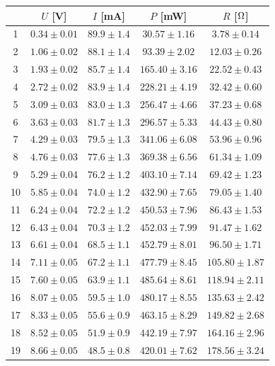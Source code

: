 \begin{table}[!h]
\begin{center}
\begin{tabular}{|c|c|c|c|c|}
\hline
& $U$ [V] & $I$ [mA] & $P$ [mW] & $R$ [$\rm \Omega$] \\
\hline
1	&	$0.34 \pm 0.01$	&	$89.9 \pm 1.4$	&	$30.57 \pm 1.16$	&	$3.78 \pm 0.14$	\\
\hline
2	&	$1.06 \pm 0.02$	&	$88.1 \pm 1.4$	&	$93.39 \pm 2.02$	&	$12.03 \pm 0.26$	\\
\hline
3	&	$1.93 \pm 0.02$	&	$85.7 \pm 1.4$	&	$165.40 \pm 3.16$	&	$22.52 \pm 0.43$	\\
\hline
4	&	$2.72 \pm 0.02$	&	$83.9 \pm 1.4$	&	$228.21 \pm 4.19$	&	$32.42 \pm 0.60$	\\
\hline
5	&	$3.09 \pm 0.03$	&	$83.0 \pm 1.3$	&	$256.47 \pm 4.66$	&	$37.23 \pm 0.68$	\\
\hline
6	&	$3.63 \pm 0.03$	&	$81.7 \pm 1.3$	&	$296.57 \pm 5.33$	&	$44.43 \pm 0.80$	\\
\hline
7	&	$4.29 \pm 0.03$	&	$79.5 \pm 1.3$	&	$341.06 \pm 6.08$	&	$53.96 \pm 0.96$	\\
\hline
8	&	$4.76 \pm 0.03$	&	$77.6 \pm 1.3$	&	$369.38 \pm 6.56$	&	$61.34 \pm 1.09$	\\
\hline
9	&	$5.29 \pm 0.04$	&	$76.2 \pm 1.2$	&	$403.10 \pm 7.14$	&	$69.42 \pm 1.23$	\\
\hline
10	&	$5.85 \pm 0.04$	&	$74.0 \pm 1.2$	&	$432.90 \pm 7.65$	&	$79.05 \pm 1.40$	\\
\hline
11	&	$6.24 \pm 0.04$	&	$72.2 \pm 1.2$	&	$450.53 \pm 7.96$	&	$86.43 \pm 1.53$	\\
\hline
12	&	$6.43 \pm 0.04$	&	$70.3 \pm 1.2$	&	$452.03 \pm 7.99$	&	$91.47 \pm 1.62$	\\
\hline
13	&	$6.61 \pm 0.04$	&	$68.5 \pm 1.1$	&	$452.79 \pm 8.01$	&	$96.50 \pm 1.71$	\\
\hline
14	&	$7.11 \pm 0.05$	&	$67.2 \pm 1.1$	&	$477.79 \pm 8.45$	&	$105.80 \pm 1.87$	\\
\hline
15	&	$7.60 \pm 0.05$	&	$63.9 \pm 1.1$	&	$485.64 \pm 8.61$	&	$118.94 \pm 2.11$	\\
\hline
16	&	$8.07 \pm 0.05$	&	$59.5 \pm 1.0$	&	$480.17 \pm 8.55$	&	$135.63 \pm 2.42$	\\
\hline
17	&	$8.33 \pm 0.05$	&	$55.6 \pm 0.9$	&	$463.15 \pm 8.29$	&	$149.82 \pm 2.68$	\\
\hline
18	&	$8.52 \pm 0.05$	&	$51.9 \pm 0.9$	&	$442.19 \pm 7.97$	&	$164.16 \pm 2.96$	\\
\hline
19	&	$8.66 \pm 0.05$	&	$48.5 \pm 0.8$	&	$420.01 \pm 7.62$	&	$178.56 \pm 3.24$	\\

\end{tabular}
\end{center}
\end{table}
